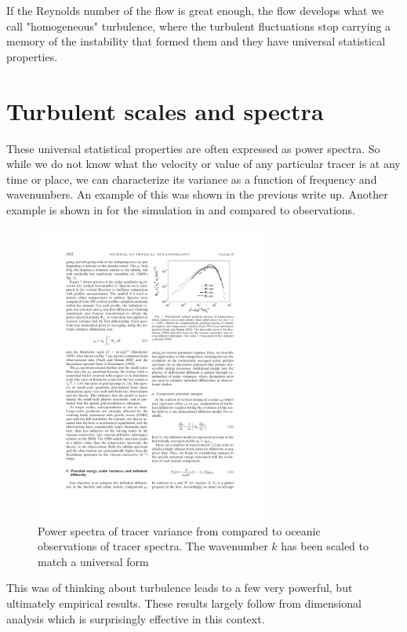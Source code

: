 \documentclass[11pt]{article}
\begin{document}
If the Reynolds number of the flow is great enough, the flow develops what we call "homogeneous" turbulence, where the turbulent fluctuations stop carrying a memory of the instability that formed them and they have universal statistical properties.  

\section{Turbulent scales and spectra}

These universal statistical properties are often expressed as power spectra.  So while we do not know what the velocity or value of any particular tracer is at any time or place, we can characterize its variance as a function of frequency and wavenumbers.  An example of this was shown in the previous write up.   Another example is shown in  for the simulation in  and compared to observations.  

\begin{figure}[hbtp]
  \begin{center}\includegraphics[width=3in]{images/SmythMoum05Fig7.pdf}
    \caption{Power spectra of tracer variance from \citep{smythetal05} compared to oceanic observations of tracer spectra. The wavenumber $k$ has been scaled to match a universal form}
    \label{fig:SmythMoum05Fig7}
  \end{center}
\end{figure}

This was of thinking about turbulence leads to a few very powerful, but ultimately empirical results.  These results largely follow from dimensional analysis which is surprisingly effective in this context.
\end{document}
